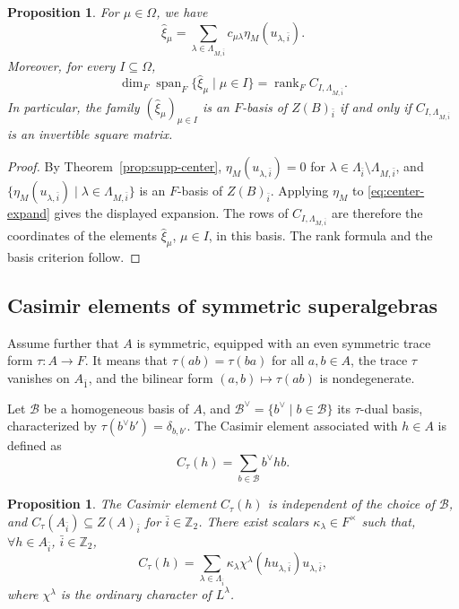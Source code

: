 \documentclass[11pt]{amsart}
\numberwithin{equation}{section}
\theoremstyle{plain}
\newtheorem{prop}[thm]{Proposition}
\theoremstyle{definition}
\theoremstyle{remark}
\DeclareMathOperator{\Span}{span}
\DeclareMathOperator{\rank}{rank}
\begin{document}
\begin{prop}\label{prop:coeff-matrix}
For $\mu\in\Omega$, we have
$$
\widehat{\xi}_\mu
=\sum_{\lambda\in\Lambda_{M,\bar i}}
c_{\mu\lambda}\eta_M(u_{\lambda,\bar{i}}).
$$
Moreover, for every $I\subseteq\Omega$,
$$
\dim_F\Span_F\{\widehat{\xi}_\mu\mid\mu\in I\}
=\rank_F C_{I,\Lambda_{M,\bar i}}.
$$
In particular, the family
$(\widehat{\xi}_\mu)_{\mu\in I}$ is an $F$-basis of
$Z(B)_{\bar i}$ if and only if
$C_{I,\Lambda_{M,\bar i}}$ is an invertible square matrix.
\end{prop}

\begin{proof}
By Theorem~\ref{prop:supp-center},
$\eta_M(u_{\lambda,\bar i})=0$ for
$\lambda\in\Lambda_{\bar i}\setminus\Lambda_{M,\bar i}$,
and
$\{\eta_M(u_{\lambda,\bar i})\mid\lambda\in\Lambda_{M,\bar i}\}$
is an $F$-basis of $Z(B)_{\bar i}$.
Applying $\eta_M$ to \eqref{eq:center-expand} gives the
displayed expansion.
The rows of $C_{I,\Lambda_{M,\bar i}}$ are therefore the
coordinates of the elements $\widehat{\xi}_\mu$, $\mu\in I$,
in this basis.
The rank formula and the basis criterion follow.
\end{proof}


\subsection{Casimir elements of symmetric superalgebras}
Assume further that $A$ is symmetric, equipped with an even symmetric trace form $\tau:A\to F$. It means that 
$\tau(ab)=\tau(ba)$ for all $a,b\in A$, the trace $\tau$ vanishes
on $A_{\bar1}$, and the bilinear form
$(a,b)\mapsto\tau(ab)$ is nondegenerate. 

Let $\mathcal B$ be a homogeneous basis of $A$, and
$\mathcal B^\vee=\{b^\vee\mid b\in\mathcal B\}$ its
$\tau$-dual basis, characterized by
$\tau(b^\vee b')=\delta_{b,b'}$.
The Casimir element associated with $h\in A$ is defined as
\begin{equation}\label{eq:casimir-map}
C_\tau(h)=\sum_{b\in\mathcal B}b^\vee h b.
\end{equation}

\begin{prop}\label{prop:casimir-form}
The Casimir element $C_\tau(h)$ is independent of the choice of $\mathcal B$,
and $C_\tau(A_{\bar i})\subseteq Z(A)_{\bar i}$ for
$\bar i\in\mathbb Z_2$. There exist scalars
$\kappa_\lambda\in F^\times$ such that, $\forall h\in A_{\bar{i}}$, $\bar i\in\mathbb{Z}_2$,
\begin{equation}\label{eq:casimir-expand}
C_\tau(h)
=\sum_{\lambda\in\Lambda_{\bar i}}
  \kappa_\lambda\chi^\lambda(h u_{\lambda,\bar i})u_{\lambda,\bar i},
\end{equation}
where $\chi^\lambda$ is the ordinary character of $L^\lambda$.
\end{prop}
\end{document}
